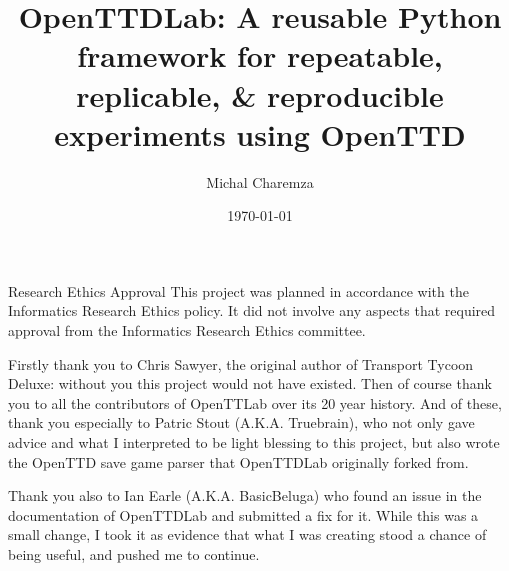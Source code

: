 \documentclass[logo,msc,dsti]{infthesis}    %
\begin{document}
\begin{preliminary}

\title{OpenTTDLab: A reusable Python framework for repeatable, replicable, \& reproducible experiments using OpenTTD}

\author{Michal Charemza}

\date{\today}


\maketitle

\newenvironment{ethics}
   {\begin{frontenv}{Research Ethics Approval}{\LARGE}}
   {\end{frontenv}\newpage}

\begin{ethics}
This project was planned in accordance with the Informatics Research
Ethics policy. It did not involve any aspects that required approval
from the Informatics Research Ethics committee.

\standarddeclaration
\end{ethics}


\begin{acknowledgements}

Firstly thank you to Chris Sawyer, the original author of Transport Tycoon Deluxe: without you this project would not have existed. Then of course thank you to all the contributors of OpenTTLab over its 20 year history. And of these, thank you especially to Patric Stout (A.K.A. Truebrain), who not only gave advice and what I interpreted to be light blessing to this project, but also wrote the OpenTTD save game parser that OpenTTDLab originally forked from.

Thank you also to Ian Earle (A.K.A. BasicBeluga) who found an issue in the documentation of OpenTTDLab and submitted a fix for it. While this was a small change, I took it as evidence that what I was creating stood a chance of being useful, and pushed me to continue.


\end{acknowledgements}
\end{preliminary}
\end{document}
